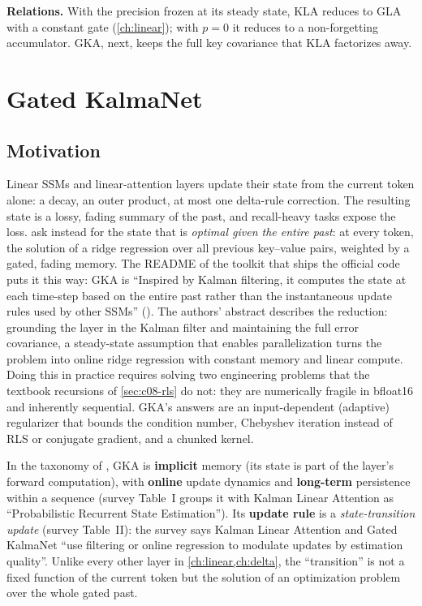 \textbf{Relations.} With the precision frozen at its steady state, KLA reduces to GLA with a
constant gate (\cref{ch:linear}); with $p=0$ it reduces to a non-forgetting accumulator. GKA,
next, keeps the full key covariance that KLA factorizes away.

\section{Gated KalmaNet}\label{sec:c08-gka}

\subsection{Motivation}

Linear SSMs and linear-attention layers update their state from the current token alone: a decay,
an outer product, at most one delta-rule correction. The resulting state is a lossy, fading
summary of the past, and recall-heavy tasks expose the loss.  ask instead for
the state that is \emph{optimal given the entire past}: at every token, the solution of a ridge
regression over all previous key--value pairs, weighted by a gated, fading memory. The README of the
toolkit that ships the official code puts it this way: GKA is ``Inspired by Kalman filtering, it
computes the state at each time-step based on the entire past rather than the instantaneous update
rules used by other SSMs'' (). The authors'
abstract describes the reduction: grounding the layer in the Kalman filter and maintaining the full
error covariance, a steady-state assumption that enables parallelization turns the problem into
online ridge regression with constant memory and linear compute. Doing this in practice requires
solving two engineering problems that the textbook recursions of \cref{sec:c08-rls} do not: they
are numerically fragile in bfloat16 and inherently sequential. GKA's answers are an input-dependent
(adaptive) regularizer that bounds the condition number, Chebyshev iteration instead of RLS or
conjugate gradient, and a chunked kernel.

\begin{taxonomy}
In the taxonomy of \citet{zhoubian2026memory}, GKA is \textbf{implicit} memory (its state is part
of the layer's forward computation), with \textbf{online} update dynamics and \textbf{long-term}
persistence within a sequence (survey Table~I groups it with Kalman Linear Attention as
``Probabilistic Recurrent State Estimation''). Its \textbf{update rule} is a \emph{state-transition
update} (survey Table~II): the survey says Kalman Linear Attention and Gated KalmaNet ``use
filtering or online regression to modulate updates by estimation quality''. Unlike every other
layer in \cref{ch:linear,ch:delta}, the ``transition'' is not a fixed function of the current token
but the solution of an optimization problem over the whole gated past.
\end{taxonomy}

